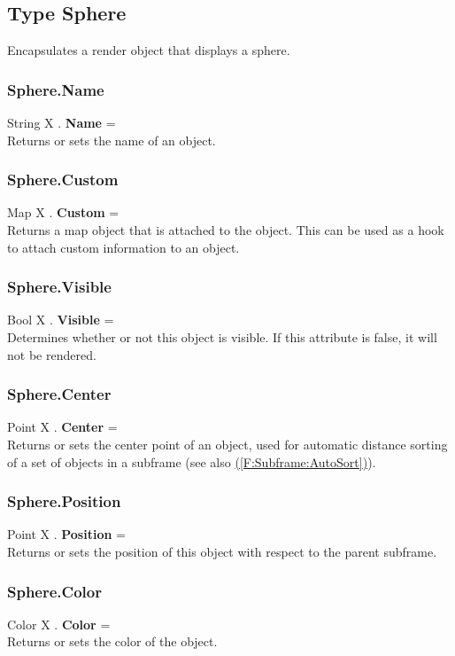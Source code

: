 \documentclass[10pt]{book}
\newcommand{\linkitem}[1]{\hyperref[#1]{\nameref{#1} (\ref{#1})}}
\begin{document}
\subsection{Type Sphere \label{T:Sphere}}
Encapsulates a render object that displays a sphere.

\subsubsection{Sphere.Name \label{F:Sphere:Name}}
String X . \textbf{Name} = \\
Returns or sets the name of an object.

\subsubsection{Sphere.Custom \label{F:Sphere:Custom}}
Map X . \textbf{Custom} = \\
Returns a map object that is attached to the object. This can be used as a hook to attach custom information to an object.


\subsubsection{Sphere.Visible \label{F:Sphere:Visible}}
Bool X . \textbf{Visible} = \\
Determines whether or not this object is visible. If this attribute is false, it will not be rendered.

\subsubsection{Sphere.Center \label{F:Sphere:Center}}
Point X . \textbf{Center} = \\
Returns or sets the center point of an object, used for automatic distance sorting of a set of objects in a subframe (see also \linkitem{F:Subframe:AutoSort}).

\subsubsection{Sphere.Position \label{F:Sphere:Position}}
Point X . \textbf{Position} = \\
Returns or sets the position of this object with respect to the parent subframe.

\subsubsection{Sphere.Color \label{F:Sphere:Color}}
Color X . \textbf{Color} = \\
Returns or sets the color of the object.
\end{document}
